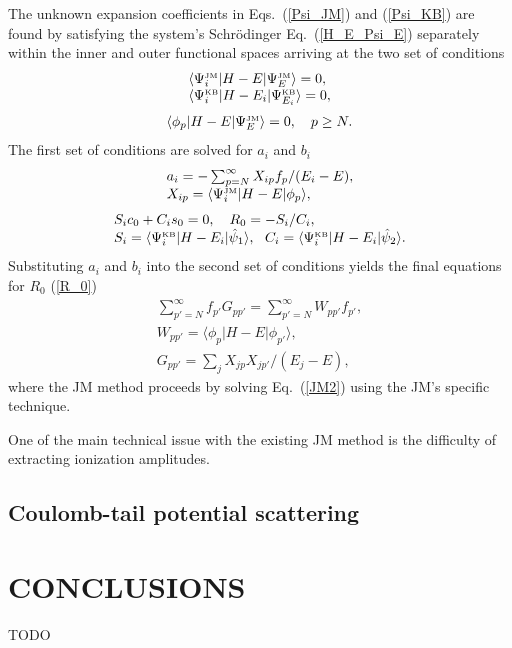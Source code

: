 \documentclass[aip
, pra
, showpacs
, aps
, twocolumn
, groupedaddress
, floatfix
]{revtex4}
\newcommand{\beq}{\begin{equation}}
\newcommand{\eeq}{\end{equation}}
\newcommand{\barr}{\begin{array}}
\newcommand{\earr}{\end{array}}
\newcommand{\JM}{\mbox{\tiny{JM}}}
\newcommand{\KB}{\mbox{\tiny{KB}}}
\begin{document}
The unknown expansion coefficients in Eqs.~(\ref{Psi_JM}) and (\ref{Psi_KB})
are found by satisfying the system's  Schr\"odinger Eq.~(\ref{H_E_Psi_E})
separately within the inner and outer functional spaces
arriving at the two set of conditions
\beq \barr{l}
\langle\Psi_i^{\JM}|H-E|\Psi_E^{\JM}\rangle= 0, \\
\langle\Psi_i^{\KB}|H-E_i|\Psi_{E_i}^{\KB}\rangle=0,
\earr \eeq
\beq \barr{l}
\langle\phi_p|H-E|\Psi_E^{\JM}\rangle=0 , \ \ \ p \geq N.
\earr \eeq
The first set of conditions are solved for $a_i$ and $b_i$
\beq \barr{l}
a_i = - \sum_{p=N}^{\infty} X_{ip} f_p / (E_i-E),\\
X_{ip}=  \langle\Psi_i^{\JM}|H-E| \phi_p \rangle ,\\
\earr \eeq
\beq \barr{l}
S_i c_0 + C_i s_0 = 0, \ \ \ 
R_0 = - S_i / C_i, \\
S_i = \langle\Psi_i^{\KB}|H-E_i|  \hat{\psi}_1 \rangle, \ \ 
C_i = \langle\Psi_i^{\KB}|H-E_i|  \hat{\psi}_2 \rangle.
\earr \eeq
Substituting $a_i$ and $b_i$ into the second set of conditions yields the final equations for $R_0$ (\ref{R_0})
\beq \barr{l}
\sum_{p'=N}^{\infty} f_{p'}  G_{pp'} = \sum_{p'=N}^{\infty} W_{pp'} f_{p'},\\
W_{pp'}  = \langle \phi_p | H-E | \phi_{p'} \rangle,\\
G_{pp'}= \sum_j X_{jp} X_{jp'}/(E_j-E),
\label{JM2} \earr \eeq
where the JM method proceeds by solving Eq.~(\ref{JM2}) using the JM's specific technique.




One of the main technical issue with the existing JM method is the difficulty of extracting ionization amplitudes.


\subsection{Coulomb-tail potential scattering}



\section{CONCLUSIONS}
TODO


\begin{acknowledgments}
\end{acknowledgments}





%
\end{document}
